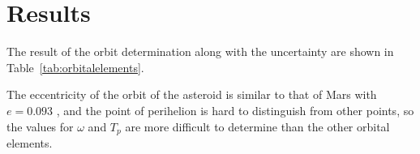 \documentclass[12pt,journal,compsoc]{IEEEtran}
\begin{document}
\begin{table}[!t]
\centering
{}
\caption{V-magnitude of 1951 Lick \label{tab:vmag}}
\end{table}

\section{Results}

The result of the orbit determination along with the uncertainty are shown in Table~\ref{tab:orbitalelements}.

\begin{table}[!t]
\centering
{}
\caption{Measured orbital elements of 1951 Lick \label{tab:orbitalelements}}
\end{table}

The eccentricity of the orbit of the asteroid is similar to that of Mars with 
$e = 0.093$ \cite{bib:HORIZONS}, 
and the point of perihelion is hard to distinguish from other points, 
so the values for $\omega$ and $T_p$ are more difficult to determine than the other orbital elements.
\end{document}
